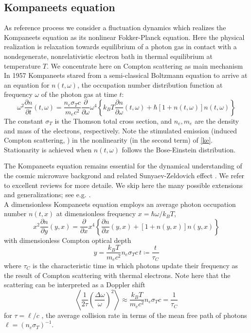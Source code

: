 \documentclass[a4paper,12pt,reqno,superscriptaddress,nofootinbib]{article}
\theoremstyle{plain}
\theoremstyle{definition}
\theoremstyle{remark}
\newcommand{\0}{^{(0)}}
\newcommand{\1}{^{(1)}}
\newcommand{\2}{^{(2)}}
\begin{document}
\subsection{Kompaneets equation}
As reference process we consider a fluctuation dynamics which realizes the Kompaneets equation as its nonlinear Fokker-Planck equation.  Here the physical realization is
relaxation towards equilibrium of a photon gas in contact with a nondegenerate, nonrelativistic electron bath in thermal equilibrium at temperature $T$.  We concentrate here on Compton scattering as main mechanism  In 1957 Kompaneets \cite{kompa}  stared from a semi-classical Boltzmann equation to arrive at an equation for $n(t,\omega)$, the occupation number distribution function  at frequency $\omega$ of the photon gas at time $t$:
\begin{equation}\label{ke}
\omega^2\frac{\partial n}{\partial t}(t,\omega)= \frac{n_e\sigma_T 
	c}{m_e c^2}\frac{\partial }{\partial \omega}\omega^4\left\{k_B T 
\frac{\partial n}{\partial \omega}(t,\omega) + 
\hbar\left[1+n(t,\omega)\right]n(t,\omega)\right\}
\end{equation}
The constant $\sigma_T$ is the Thomson total cross section, and $n_e,m_e$ are  the density and mass of the electrons, respectively.
Note the stimulated emission (induced Compton scattering, \cite{liedahl, blandford})  in the  nonlinearity (in the second term) of \eqref{ke}.  Stationarity is achieved when $n(t,\omega)$ follows the Bose-Einstein distribution.  

The Kompaneets equation remains essential for the dynamical understanding of the cosmic microwave backgrond and related Sunyaev-Zeldovich effect \cite{sunyaeveffect,sunyaev}.
We refer to excellent reviews \cite{practical,gui,zeldovich} for more detaile. We skip here the many possible extensions and generalizations; see e.g. \cite{buet, pitrou,barbosa, brown, itoh, itoh2, cooper, kohyama1, kohyama2, kohyama3,paper}.\\

A dimensionless Kompaneets equation  employs an average photon occupation number $n(t, x)$ at dimensionless frequency $x= \hbar \omega/k_B T$,
\begin{equation}\label{ake}
x^2\frac{\partial n}{\partial y}(y,x) = \frac{\partial }{\partial x}x^4\left\{
\frac{\partial n}{\partial x}(y,x) + 
\left[1+n(y,x)\right]n(y,x)\right\}
\end{equation}
with dimensionless Compton optical depth
\[y = \frac{ k_B T }{m_e c^2} n_e \sigma_T c \, t\coloneqq \frac{ t}{\tau_C}\]
where $\tau_C$ is  the  characteristic time in which photons update their frequency as the result of Compton scattering with thermal electrons.  Note here that the scattering can be interpreted as a Doppler shift
\begin{equation}\label{shift}
\left\langle\frac{1}{2\tau}\left(\frac{\Delta\omega}{\omega}\right)^2\right\rangle\approx \frac{ k_B T }{m_e c^2} n_e \sigma_T c= \frac{1}{\tau_C}
\end{equation} 
for $\tau = \ell/c$ ,  the average collision rate in terms of the mean free path of photons $\ell=(n_e\sigma_T)^{-1}$.\\
\end{document}
